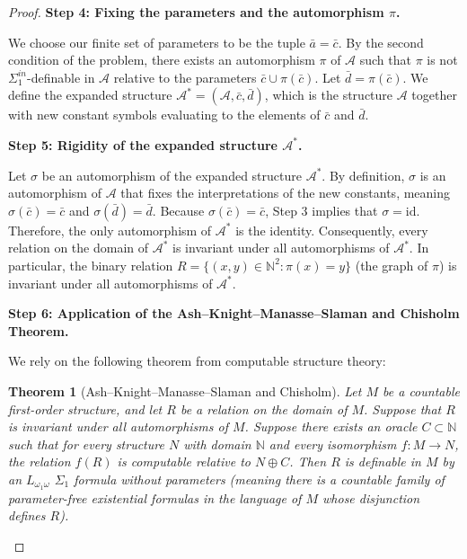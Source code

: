 \documentclass[12pt]{article}
\newtheorem*{theorem*}{Theorem}
\begin{document}
\begin{proof}
\textbf{Step 4: Fixing the parameters and the automorphism $\pi$.}

We choose our finite set of parameters to be the tuple $\bar{a} = \bar{c}$. By the second condition of the problem, there exists an automorphism $\pi$ of $\mathcal{A}$ such that $\pi$ is not $\Sigma^{in}_1$-definable in $\mathcal{A}$ relative to the parameters $\bar{c} \cup \pi(\bar{c})$. 
Let $\bar{d} = \pi(\bar{c})$. 
We define the expanded structure $\mathcal{A}^* = (\mathcal{A}, \bar{c}, \bar{d})$, which is the structure $\mathcal{A}$ together with new constant symbols evaluating to the elements of $\bar{c}$ and $\bar{d}$. 

\textbf{Step 5: Rigidity of the expanded structure $\mathcal{A}^*$.}

Let $\sigma$ be an automorphism of the expanded structure $\mathcal{A}^*$. By definition, $\sigma$ is an automorphism of $\mathcal{A}$ that fixes the interpretations of the new constants, meaning $\sigma(\bar{c}) = \bar{c}$ and $\sigma(\bar{d}) = \bar{d}$. 
Because $\sigma(\bar{c}) = \bar{c}$, Step 3 implies that $\sigma = \mathrm{id}$. 
Therefore, the only automorphism of $\mathcal{A}^*$ is the identity. Consequently, every relation on the domain of $\mathcal{A}^*$ is invariant under all automorphisms of $\mathcal{A}^*$. 
In particular, the binary relation $R = \{(x, y) \in \mathbb{N}^2 : \pi(x) = y\}$ (the graph of $\pi$) is invariant under all automorphisms of $\mathcal{A}^*$.

\textbf{Step 6: Application of the Ash--Knight--Manasse--Slaman and Chisholm Theorem.}

We rely on the following theorem from computable structure theory:
\begin{theorem*}[Ash--Knight--Manasse--Slaman and Chisholm]
Let $M$ be a countable first-order structure, and let $R$ be a relation on the domain of $M$. Suppose that $R$ is invariant under all automorphisms of $M$. Suppose there exists an oracle $C \subset \mathbb{N}$ such that for every structure $N$ with domain $\mathbb{N}$ and every isomorphism $f: M \to N$, the relation $f(R)$ is computable relative to $N \oplus C$. Then $R$ is definable in $M$ by an $L_{\omega_1\omega}$ $\Sigma_1$ formula without parameters (meaning there is a countable family of parameter-free existential formulas in the language of $M$ whose disjunction defines $R$).
\end{theorem*}


\end{proof}
\end{document}
